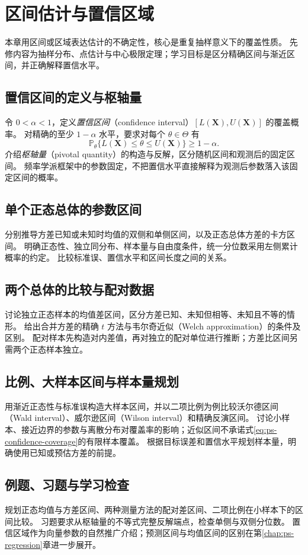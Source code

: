 \setcounter{chapter}{12} %
\chapter{区间估计与置信区域}
\label{chap:ps-intervals}

本章用区间或区域表达估计的不确定性，核心是重复抽样意义下的覆盖性质。
先修内容为抽样分布、点估计与中心极限定理；学习目标是区分精确区间与渐近区间，并正确解释置信水平。

\section{置信区间的定义与枢轴量}
\label{sec:ps-confidence-definition}
令 $0<\alpha<1$，定义\emph{置信区间}（confidence interval）$[L(\mathbf X),U(\mathbf X)]$ 的覆盖概率。
对精确的至少 $1-\alpha$ 水平，要求对每个 $\theta\in\Theta$ 有
\begin{equation}
  \mathbb P_\theta\{L(\mathbf X)\leq\theta\leq U(\mathbf X)\}\geq1-\alpha.
  \label{eq:ps-confidence-coverage}
\end{equation}
介绍\emph{枢轴量}（pivotal quantity）的构造与反解，区分随机区间和观测后的固定区间。
频率学派框架中的参数固定，不把置信水平直接解释为观测后参数落入该固定区间的概率。

\section{单个正态总体的参数区间}
\label{sec:ps-normal-intervals}
分别推导方差已知或未知时均值的双侧和单侧区间，以及正态总体方差的卡方区间。
明确正态性、独立同分布、样本量与自由度条件，统一分位数采用左侧累计概率的约定。
比较标准误、置信水平和区间长度之间的关系。

\section{两个总体的比较与配对数据}
\label{sec:ps-two-sample-intervals}
讨论独立正态样本的均值差区间，区分方差已知、未知但相等、未知且不等的情形。
给出合并方差的精确 $t$ 方法与韦尔奇近似（Welch approximation）的条件及区别。
配对样本先构造对内差值，再对独立的配对单位进行推断；方差比区间另需两个正态样本独立。

\section{比例、大样本区间与样本量规划}
\label{sec:ps-asymptotic-intervals}
用渐近正态性与标准误构造大样本区间，并以二项比例为例比较沃尔德区间（Wald interval）、威尔逊区间（Wilson interval）和精确反演区间。
讨论小样本、接近边界的参数与离散分布对覆盖率的影响；近似区间不承诺式\eqref{eq:ps-confidence-coverage}的有限样本覆盖。
根据目标误差和置信水平规划样本量，明确使用已知或预估方差的前提。

\section{例题、习题与学习检查}
规划正态均值与方差区间、两种测量方法的配对差区间、二项比例在小样本下的区间比较。
习题要求从枢轴量的不等式完整反解端点，检查单侧与双侧分位数。
置信区域作为向量参数的自然推广介绍；预测区间与均值区间的区别在第\ref{chap:ps-regression}章进一步展开。






